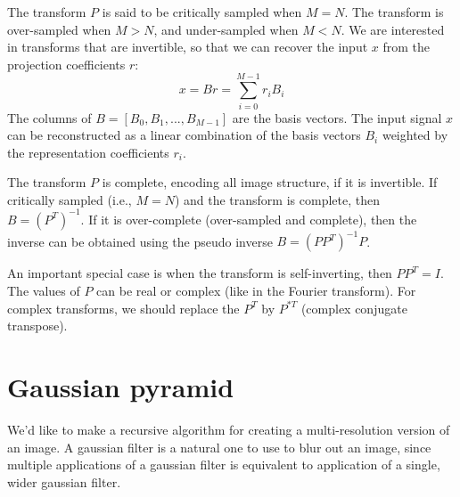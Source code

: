 The transform $P$ is said to be critically sampled when $M=N$.  The transform is over-sampled when $M > N$, and under-sampled when $M < N$. We are interested in transforms that are invertible, so that we can recover the input $x$ from the projection coefficients $r$:
\begin{equation}
x = B r = \sum_{i=0}^{M-1} r_i B_i 
\end{equation}
The columns of $B= \left[B_0,  B_1, ...,B_{M-1}\right]$ are the basis vectors. The input signal $x$ can be reconstructed as a linear combination of the basis vectors $B_i$ weighted by the representation coefficients $r_i$.  

The transform $P$ is complete, encoding all image structure, if it is invertible. If critically sampled (i.e., $M=N$) and the transform is complete, then $B = (P^T)^{-1}$.  If it is over-complete (over-sampled and complete), then the inverse can be obtained using the pseudo inverse $B=(P P^T)^{-1}P$.

An important special case is when the transform is self-inverting, then $P P^{T} = I$. The values of $P$ can be real  or complex (like in the Fourier transform). For complex transforms, we should replace the $P^T$ by $P^{*T}$ (complex conjugate transpose).




\section{Gaussian pyramid}


%
%
%
%
%
%
%


We'd like to make a recursive algorithm for creating a multi-resolution version of an image.  A gaussian filter is a natural
one to use to blur out an image, since multiple applications of a gaussian filter is equivalent to application of a single, wider
gaussian filter.

